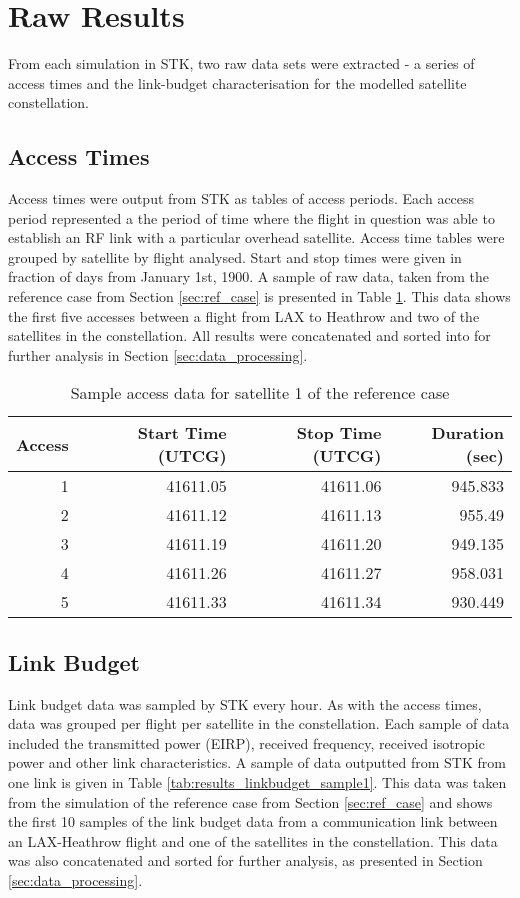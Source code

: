 \section{Raw Results}
From each simulation in STK, two raw data sets were extracted - a series of access times and the link-budget characterisation for the modelled satellite constellation.

\subsection{Access Times}
Access times were output from STK as tables of access periods. Each access period represented a the period of time where the flight in question was able to establish an RF link with a particular overhead satellite. Access time tables were grouped by satellite by flight analysed. Start and stop times were given in fraction of days from January 1st, 1900. A sample of raw data, taken from the reference case from Section \ref{sec:ref_case} is presented in Table \ref{tab:results_access_sample1}. This data shows the first five accesses between a flight from LAX to Heathrow and two of the satellites in the constellation. All results were concatenated and sorted into for further analysis in Section \ref{sec:data_processing}.
\begin{table}[H]
  \centering
  \caption{Sample access data for satellite 1 of the reference case}
    \begin{tabular}{rrrr}
    \toprule
    Access & Start Time (UTCG) & Stop Time (UTCG) & Duration (sec) \\
    \midrule
    1     & 41611.05 & 41611.06 & 945.833 \\
    2     & 41611.12 & 41611.13 & 955.49 \\
    3     & 41611.19 & 41611.20 & 949.135 \\
    4     & 41611.26 & 41611.27 & 958.031 \\
    5     & 41611.33 & 41611.34 & 930.449 \\
    \bottomrule
    \end{tabular}%
  \label{tab:results_access_sample1}%
\end{table}%


\subsection{Link Budget}
Link budget data was sampled by STK every hour. As with the access times, data was grouped per flight per satellite in the constellation. Each sample of data included the transmitted power (EIRP), received frequency, received isotropic power and other link characteristics. A sample of data outputted from STK from one link is given in Table \ref{tab:results_linkbudget_sample1}. This data was taken from the simulation of the reference case from Section \ref{sec:ref_case} and shows the first 10 samples of the link budget data from a communication link between an LAX-Heathrow flight and one of the satellites in the constellation. This data was also concatenated and sorted for further analysis, as presented in Section \ref{sec:data_processing}.


